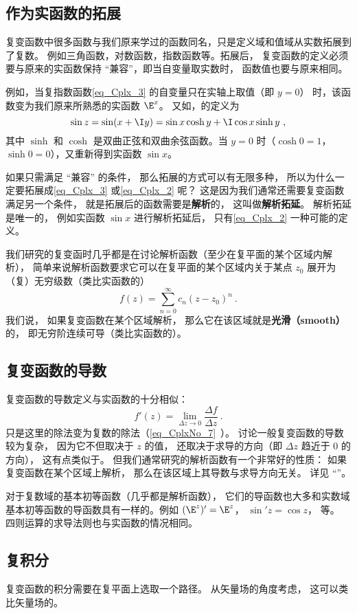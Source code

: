 \subsection{作为实函数的拓展}
复变函数中很多函数与我们原来学过的函数同名，只是定义域和值域从实数拓展到了复数。 例如三角函数，对数函数，指数函数等。拓展后， 复变函数的定义必须要与原来的实函数保持 “兼容”，即当自变量取实数时， 函数值也要与原来相同。

例如，当复指数函数\autoref{eq_Cplx_3} 的自变量只在实轴上取值（即 $y = 0$） 时，该函数变为我们原来所熟悉的实函数 $\E^x$。  又如，的定义为
\begin{equation}\label{eq_Cplx_2}
\sin z = \sin(x + \I y) = \sin x\cosh y + \I\cos x\sinh y~,
\end{equation}
其中 $\sinh $ 和 $\cosh $ 是双曲正弦和双曲余弦函数。当 $y = 0$ 时（$\cosh 0 = 1$， $\sinh 0 = 0$），又重新得到实函数 $\sin x$。

如果只需满足 “兼容” 的条件， 那么拓展的方式可以有无限多种， 所以为什么一定要拓展成\autoref{eq_Cplx_3} 或\autoref{eq_Cplx_2} 呢？ 这是因为我们通常还需要复变函数满足另一个条件， 就是拓展后的函数需要是\textbf{解析}的， 这叫做\textbf{解析拓延}。 %
解析拓延是唯一的， 例如实函数 $\sin x$ 进行解析拓延后， 只有\autoref{eq_Cplx_2} 一种可能的定义。

我们研究的复变函时几乎都是在讨论解析函数（至少在复平面的某个区域内解析）， 简单来说解析函数要求它可以在复平面的某个区域内关于某点 $z_0$ 展开为（复）无穷级数（类比实函数的）
\begin{equation}
f(z) = \sum_{n=0}^\infty c_n (z - z_0)^n~.
\end{equation}
我们说， 如果复变函数在某个区域解析， 那么它在该区域就是\textbf{光滑（smooth）}的， 即无穷阶连续可导（类比实函数的）。

\subsection{复变函数的导数}
复变函数的导数定义与实函数的十分相似：
\begin{equation}
f'(z) = \lim_{\Delta z \to 0} \frac{\Delta f}{\Delta z}~.
\end{equation}
只是这里的除法变为复数的除法（\autoref{eq_CplxNo_7}~）。 讨论一般复变函数的导数较为复杂， 因为它不但取决于 $z$ 的值， 还取决于求导的方向（即 $\Delta z$ 趋近于 $0$ 的方向）， 这有点类似于。 但我们通常研究的解析函数有一个非常好的性质： 如果复变函数在某个区域上解析， 那么在该区域上其导数与求导方向无关。 详见 “”。

对于复数域的基本初等函数（几乎都是解析函数）， 它们的导函数也大多和实数域基本初等函数的导函数具有一样的。例如 $(\E^z)' = \E^z$， $\sin' z = \cos z$， 等。 四则运算的求导法则也与实函数的情况相同。

\subsection{复积分}
复变函数的积分需要在复平面上选取一个路径。 从矢量场的角度考虑， 这可以类比矢量场的。
